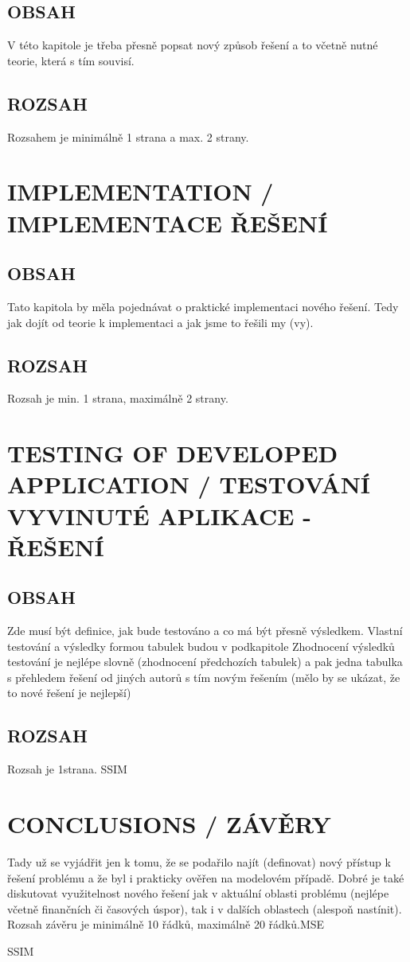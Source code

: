 \documentclass[journal]{IEEEtran}
\begin{document}
\subsection{OBSAH}
V této kapitole je třeba přesně popsat nový způsob řešení a to včetně nutné teorie, která s tím souvisí. 
\subsection{ROZSAH}
Rozsahem je minimálně 1 strana a max. 2 strany.




\section{IMPLEMENTATION / IMPLEMENTACE ŘEŠENÍ}
\subsection{OBSAH}
Tato kapitola by měla pojednávat o praktické implementaci nového řešení. Tedy jak dojít od teorie k implementaci a jak jsme to řešili my (vy).
\subsection{ROZSAH}
Rozsah je min. 1 strana, maximálně 2 strany.





\section{TESTING OF DEVELOPED APPLICATION / TESTOVÁNÍ VYVINUTÉ APLIKACE - ŘEŠENÍ}
\subsection{OBSAH}
Zde musí být definice, jak bude testováno a co má být přesně výsledkem.
Vlastní testování a výsledky formou tabulek budou v podkapitole
Zhodnocení výsledků testování je nejlépe slovně (zhodnocení předchozích tabulek) a pak jedna tabulka s přehledem řešení od jiných autorů s tím novým řešením (mělo by se ukázat, že to nové řešení je nejlepší)
\subsection{ROZSAH}
Rozsah je 1strana. \ac{SSIM}



\section{CONCLUSIONS / ZÁVĚRY}
Tady už se vyjádřit jen k tomu, že se podařilo najít (definovat) nový přístup k řešení problému a že byl i prakticky ověřen na modelovém případě. 
Dobré je také diskutovat využitelnost nového řešení jak v aktuální oblasti problému (nejlépe včetně finančních či časových úspor), tak i v dalších oblastech (alespoň nastínit).
Rozsah závěru je minimálně 10 řádků, maximálně 20 řádků.\ac{MSE}\cite{einstein}

\ac{SSIM}


\printbibliography

\printacronyms


\end{document}
